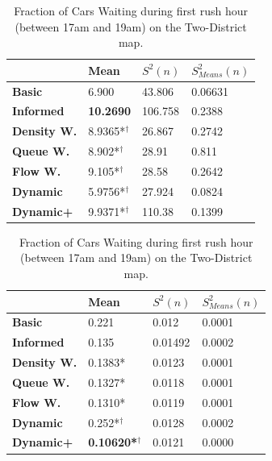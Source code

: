 \documentclass[11pt]{article}
\begin{document}
\begin{table}[h]
\centering
\caption{Average Velocity of Cars during second rush hour (between 17am and 19am) on the Two-Districts map.}
\label{my-label}
\begin{tabular}{l|l|l|l|}
\textbf{}                 & \textbf{Mean} & \textbf{$S^2(n)$} & \textbf{$S_{Means}^2(n)$} \\
\hline\textbf{Basic}      & 6.900           & 43.806            & 0.06631                    \\
\textbf{Informed}   & \textbf{10.2690} & 106.758           & 0.2388                     \\
\hline\textbf{Density W.} & 8.9365*$^\dagger$           & 26.867            & 0.2742                     \\
\textbf{Queue W.}   & 8.902*$^\dagger$            & 28.91             & 0.811                      \\
\textbf{Flow W.}    & 9.105*$^\dagger$            & 28.58             & 0.2642                     \\
\textbf{Dynamic}    & 5.9756*$^\dagger$          & 27.924            & 0.0824                     \\
\textbf{Dynamic+}   & 9.9371*$^\dagger$           & 110.38            & 0.1399                    
\end{tabular}

\centering
\caption{Fraction of Cars Waiting during first rush hour (between 17am and 19am) on the Two-District map.}
\label{my-label}
\begin{tabular}{l|l|l|l|}
\textbf{}                 & \textbf{Mean} & \textbf{$S^2(n)$} & \textbf{$S_{Means}^2(n)$} \\
\hline\textbf{Basic}      & 0.221            & 0.012             & 0.0001                     \\
\textbf{Informed}   & 0.135            & 0.01492           & 0.0002                     \\
\hline\textbf{Density W.} & 0.1383*           & 0.0123            & 0.0001                     \\
\textbf{Queue W.}   & 0.1327*           & 0.0118            & 0.0001                     \\
\textbf{Flow W.}    & 0.1310*           & 0.0119            & 0.0001                     \\
\textbf{Dynamic}    & 0.252*$^\dagger$            & 0.0128            & 0.0002                     \\
\textbf{Dynamic+}   & \textbf{0.10620*$^\dagger$} & 0.0121            & 0.0000                    
\end{tabular}
\end{table}
\end{document}

